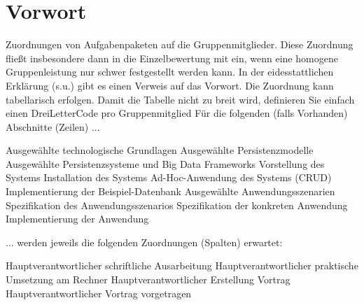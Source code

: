 \chapter{Vorwort}
\cite{edlich01}
\cite{sadalage01}
\cite{redmont01}
\cite{Jing01}
\cite{Bogdan01}
\cite{Meier01}
\cite{Fasel01}
\cite{Meier02}
\cite{Fasel02}
\cite{Boicea01}
\cite{Parker01}
\cite{Abramova01}
\cite{Faraj01}
\cite{Shakuntala01}
\cite{Hows01}
\cite{fowler01}
\cite{harrison01}
Zuordnungen von Aufgabenpaketen auf die Gruppenmitglieder. Diese Zuordnung fließt insbesondere dann in die Einzelbewertung mit ein, wenn eine homogene Gruppenleistung nur schwer festgestellt werden kann.
In der eidesstattlichen Erklärung (s.u.) gibt es einen Verweis auf das Vorwort.
Die Zuordnung kann tabellarisch erfolgen. Damit die Tabelle nicht zu breit wird, definieren Sie einfach einen DreiLetterCode pro Gruppenmitglied
Für die folgenden (falls Vorhanden) Abschnitte (Zeilen) ...

    Ausgewählte technologische Grundlagen
    Ausgewählte Persistenzmodelle
    Ausgewählte Persistenzsysteme und Big Data Frameworks
        Vorstellung des Systems
        Installation des Systems
        Ad-Hoc-Anwendung des Systems (CRUD)
        Implementierung der Beispiel-Datenbank
    Ausgewählte Anwendungsszenarien
        Spezifikation des Anwendungsszenarios
        Spezifikation der konkreten Anwendung
        Implementierung der Anwendung

... werden jeweils die folgenden Zuordnungen (Spalten) erwartet:

    Hauptverantwortlicher schriftliche Ausarbeitung
    Hauptverantwortlicher praktische Umsetzung am Rechner
    Hauptverantwortlicher Erstellung Vortrag
    Hauptverantwortlicher Vortrag vorgetragen